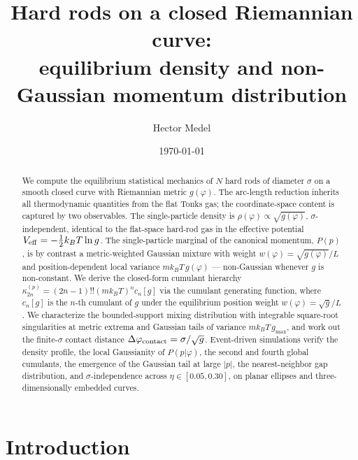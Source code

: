 \documentclass[aps,pre,twocolumn,superscriptaddress,longbibliography,floatfix]{revtex4-2}
\begin{document}
\title{Hard rods on a closed Riemannian curve:\\
equilibrium density and non-Gaussian momentum distribution}

\author{Hector Medel}

\date{\today}

\begin{abstract}
We compute the equilibrium statistical mechanics of $N$ hard rods of diameter $\sigma$ on
a smooth closed curve with Riemannian metric $g(\varphi)$.
The arc-length reduction inherits all thermodynamic quantities from the flat Tonks gas;
the coordinate-space content is captured by two observables.
The single-particle density is $\rho(\varphi)\propto\sqrt{g(\varphi)}$, $\sigma$-independent,
identical to the flat-space hard-rod gas in the effective potential
$V_{\rm eff}=-\tfrac{1}{2}k_BT\ln g$.
The single-particle marginal of the canonical momentum, $P(p)$, is by contrast a
metric-weighted Gaussian mixture with weight $w(\varphi)=\sqrt{g(\varphi)}/L$ and
position-dependent local variance $mk_BT\,g(\varphi)$ — non-Gaussian whenever $g$ is
non-constant.
We derive the closed-form cumulant hierarchy
$\kappa_{2n}^{(p)}=(2n-1)!!(mk_BT)^n c_n[g]$ via the cumulant generating function,
where $c_n[g]$ is the $n$-th cumulant of $g$ under the equilibrium position weight
$w(\varphi)=\sqrt{g}/L$.
We characterize the bounded-support mixing distribution with integrable square-root
singularities at metric extrema and Gaussian tails of variance $mk_BT\,g_{\max}$, and
work out the finite-$\sigma$ contact distance $\Delta\varphi_{\rm contact}=\sigma/\sqrt{g}$.
Event-driven simulations verify the density profile, the local Gaussianity of $P(p|\varphi)$,
the second and fourth global cumulants, the emergence of the Gaussian tail at large $|p|$,
the nearest-neighbor gap distribution, and $\sigma$-independence across
$\eta\in[0.05,0.30]$, on planar ellipses and three-dimensionally embedded curves.
\end{abstract}

\maketitle

\section{Introduction}
\label{sec:intro}
\end{document}
